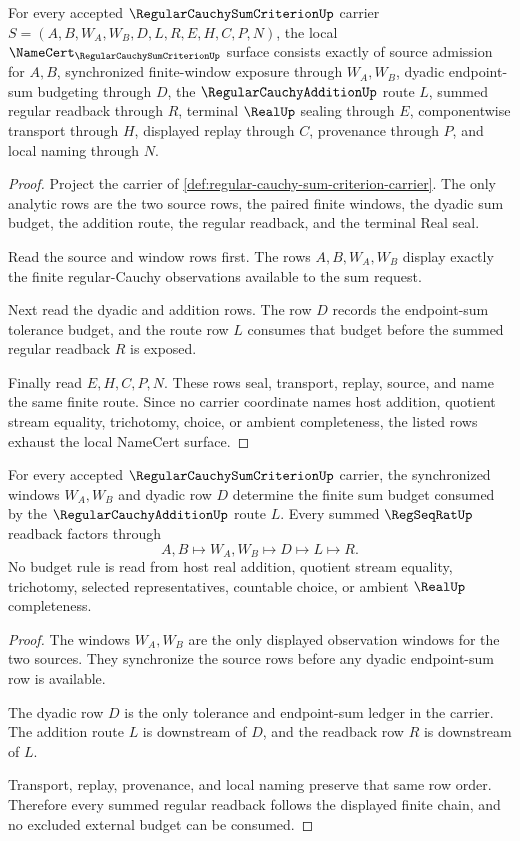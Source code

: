 \begin{theorem}
\label{thm:regular-cauchy-sum-criterion-namecert-obligations}
For every accepted $\RegularCauchySumCriterionUp$ carrier $S=(A,B,W_A,W_B,D,L,R,E,H,C,P,N)$, the local $\NameCert_{\RegularCauchySumCriterionUp}$ surface consists exactly of source admission for $A,B$, synchronized finite-window exposure through $W_A,W_B$, dyadic endpoint-sum budgeting through $D$, the $\RegularCauchyAdditionUp$ route $L$, summed regular readback through $R$, terminal $\RealUp$ sealing through $E$, componentwise transport through $H$, displayed replay through $C$, provenance through $P$, and local naming through $N$.
\end{theorem}
\begin{proof}
Project the carrier of \autoref{def:regular-cauchy-sum-criterion-carrier}. The only analytic rows are the two source rows, the paired finite windows, the dyadic sum budget, the addition route, the regular readback, and the terminal Real seal.

Read the source and window rows first. The rows $A,B,W_A,W_B$ display exactly the finite regular-Cauchy observations available to the sum request.

Next read the dyadic and addition rows. The row $D$ records the endpoint-sum tolerance budget, and the route row $L$ consumes that budget before the summed regular readback $R$ is exposed.

Finally read $E,H,C,P,N$. These rows seal, transport, replay, source, and name the same finite route. Since no carrier coordinate names host addition, quotient stream equality, trichotomy, choice, or ambient completeness, the listed rows exhaust the local NameCert surface.
\end{proof}

\begin{theorem}
\label{thm:regular-cauchy-sum-criterion-window-budget-exactness}
For every accepted $\RegularCauchySumCriterionUp$ carrier, the synchronized windows $W_A,W_B$ and dyadic row $D$ determine the finite sum budget consumed by the $\RegularCauchyAdditionUp$ route $L$. Every summed $\RegSeqRatUp$ readback factors through
$$
A,B \longmapsto W_A,W_B \longmapsto D \longmapsto L \longmapsto R .
$$
No budget rule is read from host real addition, quotient stream equality, trichotomy, selected representatives, countable choice, or ambient $\RealUp$ completeness.
\end{theorem}
\begin{proof}
The windows $W_A,W_B$ are the only displayed observation windows for the two sources. They synchronize the source rows before any dyadic endpoint-sum row is available.

The dyadic row $D$ is the only tolerance and endpoint-sum ledger in the carrier. The addition route $L$ is downstream of $D$, and the readback row $R$ is downstream of $L$.

Transport, replay, provenance, and local naming preserve that same row order. Therefore every summed regular readback follows the displayed finite chain, and no excluded external budget can be consumed.
\end{proof}

